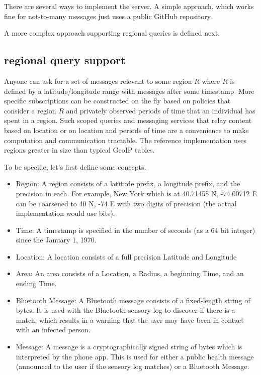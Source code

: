 \documentclass{article}
\begin{document}
There are several ways to implement the server.  A simple approach, which works fine for not-to-many messages just uses a public GitHub repository.

A more complex approach supporting regional queries is defined next.  

\subsection{regional query support}
Anyone can ask for a set of messages relevant to some region $R$ where $R$ is defined by a latitude/longitude range with messages after some timestamp.  More specific subscriptions can be constructed on the fly based on policies that consider a region $R$ and privately observed periods of time that an individual has spent in a region. Such scoped queries and messaging services that relay content based on location or on location and periods of time are a convenience to make computation and communication tractable.  The reference implementation uses regions greater in size than typical GeoIP tables.

To be specific, let's first define some concepts.
\begin{itemize}
    \item Region: A region consists of a latitude prefix, a longitude prefix, and the precision in each.  For example, New York which is at 40.71455 N, -74.00712 E can be coarsened to 40 N, -74 E with two digits of precision (the actual implementation would use bits).
    \item Time: A timestamp is specified in the number of seconds (as a 64 bit integer) since the January 1, 1970. 
    \item Location: A location consists of a full precision Latitude and Longitude
    \item Area: An area consists of a Location, a Radius, a beginning Time, and an ending Time.
    \item Bluetooth Message: A Bluetooth message consists of a fixed-length string of bytes.  It is used with the Bluetooth sensory log to discover if there is a match, which results in a warning that the user may have been in contact with an infected person.  
    \item Message: A message is a cryptographically signed string of bytes which is interpreted by the phone app. This is used for either a public health message (announced to the user if the sensory log matches) or a Bluetooth Message. 
\end{itemize}
\end{document}
